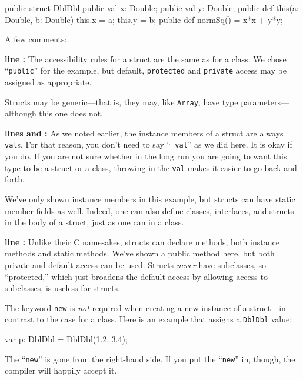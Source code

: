 \begin{xtennum}[]
public  struct DblDbl {
   public val x: Double;
   public val y: Double;
   public def this(a: Double, b: Double) { 
      this.x = a; this.y = b;
   }
   public def normSq() = x*x + y*y;
}
\end{xtennum}



A few comments:
\begin{description}
\item{\bf line :} The accessibility rules for a struct are the same as for a
class.  We chose ``{\tt public}'' for the example, but default, {\tt protected} 
and {\tt private} access may be assigned as appropriate.

Structs may be generic---that is, they may, like {\tt Array}, have type
parameters---although this one does not.

\item{\bf lines  and :}  As we noted earlier, the instance members of a struct
are always {\tt val}s. For that reason, you don't need to say ``{\tt
val}'' as we did here.  It is okay if you do. If you are not sure whether in
the long run you are going to want this type to be a struct or a class,
throwing in the {\tt val} makes it easier to go back and forth.

We've only shown instance members in this example, but
structs can have static member fields as well.
Indeed, one can also define classes, interfaces, and structs in the
body of a struct, just as one can in a class.
\item 
 
\item{\bf line :} Unlike their C namesakes, \Xten{} structs can declare
methods, both instance methods and static methods. We've shown a public
method here, but both private and default access can be used. Structs
{\em never} have subclasses, so ``protected,'' which just broadens the default
access by allowing access to subclasses, is useless for structs.
\end{description}

The keyword {\tt new} is {\em not} required when creating
 a new instance of a struct---in contrast to the case for a class.
Here is an example that assigns a {\tt DblDbl} value:
\begin{xtennum}[]
var p: DblDbl = DblDbl(1.2, 3.4);
\end{xtennum}
The ``{\tt new}'' is gone from the right-hand side.
If you put the ``{\tt new}'' in, though, the compiler will happily accept it.

